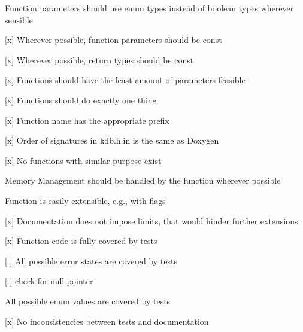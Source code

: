 {\ttfamily }

{\ttfamily 
\begin{DoxyItemize}
\item Function parameters should use enum types instead of boolean types wherever sensible
\item \mbox{[}x\mbox{]} Wherever possible, function parameters should be {\ttfamily const}
\item \mbox{[}x\mbox{]} Wherever possible, return types should be {\ttfamily const}
\item \mbox{[}x\mbox{]} Functions should have the least amount of parameters feasible
\end{DoxyItemize}}

{\ttfamily }

{\ttfamily 
\begin{DoxyItemize}
\item \mbox{[}x\mbox{]} Functions should do exactly one thing
\item \mbox{[}x\mbox{]} Function name has the appropriate prefix
\item \mbox{[}x\mbox{]} Order of signatures in kdb.\+h.\+in is the same as Doxygen
\item \mbox{[}x\mbox{]} No functions with similar purpose exist
\end{DoxyItemize}}

{\ttfamily }

{\ttfamily 
\begin{DoxyItemize}
\item Memory Management should be handled by the function wherever possible
\end{DoxyItemize}}

{\ttfamily }

{\ttfamily 
\begin{DoxyItemize}
\item Function is easily extensible, e.\+g., with flags
\item \mbox{[}x\mbox{]} Documentation does not impose limits, that would hinder further extensions
\end{DoxyItemize}}

{\ttfamily }

{\ttfamily 
\begin{DoxyItemize}
\item \mbox{[}x\mbox{]} Function code is fully covered by tests
\item \mbox{[} \mbox{]} All possible error states are covered by tests
\begin{DoxyItemize}
\item \mbox{[} \mbox{]} check for null pointer
\end{DoxyItemize}
\item All possible enum values are covered by tests
\item \mbox{[}x\mbox{]} No inconsistencies between tests and documentation
\end{DoxyItemize}}

{\ttfamily }

{\ttfamily  }

{\ttfamily }
